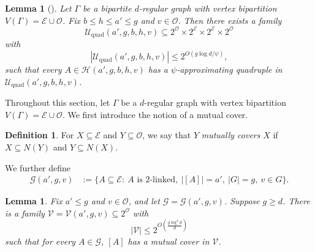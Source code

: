 \documentclass{amsart}
\newtheorem{lem}[thm]{Lemma}
\newtheorem*{lem*}{Lemma}
\theoremstyle{definition}
\newtheorem{mydef}[thm]{Definition}
\newcommand{\cO}{\mathcal{O} }
\newcommand{\cE}{\mathcal{E} }
\newcommand{\0}[0]{\emptyset}
\begin{document}
\begin{lem*}[]
Let $\Gamma$ be a bipartite $d$-regular graph with vertex bipartition $V(\Gamma)=\cE\cup \cO$.
Fix $b\le h\le a'\le g$ and $v\in \cO$. Then there exists a family
\[
\mathcal U_{\mathrm{quad}}(a',g,b,h,v)\subseteq 2^{\cO}\times 2^{\cE}\times 2^{\cE}\times 2^{\cO}
\]
with
\[
|\mathcal U_{\mathrm{quad}}(a',g,b,h,v)|
\le
2^{O(g\log d/\psi)},
\]
such that every $A\in \mathcal H(a',g,b,h,v)$ has a $\psi$-approximating quadruple in $\mathcal U_{\mathrm{quad}}(a',g,b,h,v)$.
\end{lem*}

 Throughout this section, let $\Gamma$ be a $d$-regular graph with vertex bipartition $V(\Gamma)=\cE \cup \cO$. We first introduce the notion of a mutual cover.


\begin{mydef}
    For $X\subseteq \cE$ and $Y\subseteq \cO$, we say that $Y$ \textit{mutually covers} $X$ if $X\subseteq N(Y)$ and $Y\subseteq N(X)$.
\end{mydef}

We further define
\begin{align*}
    \mathcal G(a',g,v)
&:=
\bigl\{
A\subseteq \cE:\ 
A\text{ is $2$-linked},\ |[A]|=a',\ |G|=g,\ v\in G
\bigr\}.
\end{align*}

\begin{lem}\label{lem:phi-approx-spectral}
Fix $a' \le g$ and $v \in \mathcal{O}$, and let $\mathcal{G} = \mathcal{G}(a', g, v)$. Suppose $g \ge d$. There is a family $\mathcal{V} = \mathcal{V}(a', g, v) \subseteq 2^{\mathcal{O}}$ with$$|\mathcal{V}| \le 2^{ O\left( \frac{g \log^2 d}{d} \right) }$$such that for every $A \in \mathcal{G}$, $[A]$ has a mutual cover in $\mathcal{V}$.
\end{lem}
\end{document}
